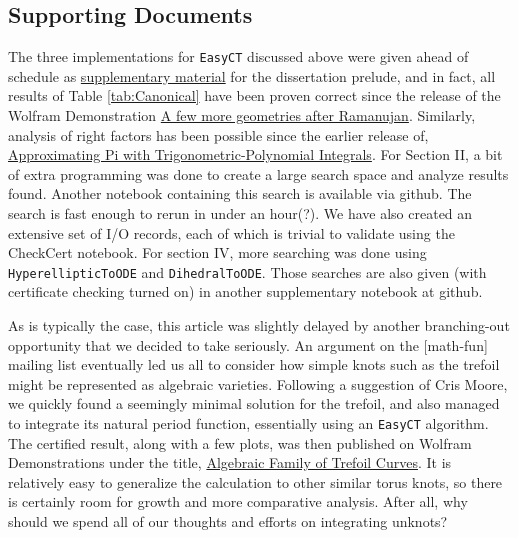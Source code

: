 \documentclass[nofootinbib,preprint]{revtex4-1}
\begin{document}
\begin{appendices}
\section{Supporting Documents}
The three implementations for \texttt{EasyCT} discussed above were given ahead of schedule 
as \href{https://github.com/bradklee/Dissertation/tree/master/Prelude/notebooks}{supplementary material} 
for the dissertation prelude, and in fact, all results of Table \ref{tab:Canonical} have been 
proven correct since the release of the Wolfram Demonstration \href{https://demonstrations.wolfram.com/AFewMoreGeometriesAfterRamanujan/}{A few more geometries after Ramanujan}. Similarly, analysis of right 
factors has been possible since the earlier release of, 
\href{https://demonstrations.wolfram.com/ApproximatingPiWithTrigonometricPolynomialIntegrals/}{Approximating 
Pi with Trigonometric-Polynomial Integrals}. For Section II, a bit of extra programming was done to 
create a large search space and analyze results found. Another notebook containing this search 
is available via github. The search is fast enough to rerun in under an hour(?). We have also created
an extensive set of I/O records, each of which is trivial to validate using the CheckCert notebook. For 
section IV, more searching was done using \texttt{HyperellipticToODE} and \texttt{DihedralToODE}.
Those searches are also given (with certificate checking turned on) in another supplementary notebook at
github.  

As is typically the case, this article was slightly delayed by another branching-out opportunity that we 
decided to take seriously. An argument on the [math-fun] mailing list eventually led us all to consider
how simple knots such as the trefoil might be represented as algebraic varieties. Following a suggestion of 
Cris Moore, we quickly found a seemingly minimal solution for the trefoil, and also managed to integrate 
its natural period function, essentially using an \texttt{EasyCT} algorithm. The certified result, along 
with a few plots, was then published on Wolfram Demonstrations under the title,
 \href{https://demonstrations.wolfram.com/AlgebraicFamilyOfTrefoilCurves/}{Algebraic Family of Trefoil Curves}.
It is relatively easy to generalize the calculation to other similar torus knots, so there is certainly 
room for growth and more comparative analysis. After all, why should we spend all of our thoughts and efforts on 
integrating unknots?   
\end{appendices}
\end{document}
